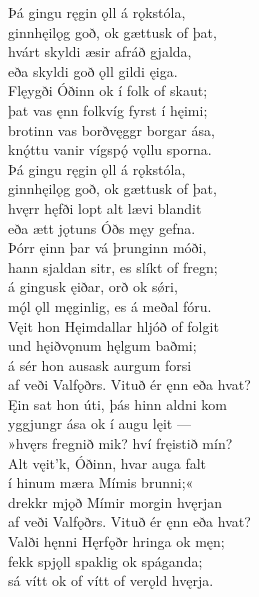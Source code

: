 \bva Þá gingu ręgin ǫll \hld á rǫkstóla, \\%
ginnhęilǫg goð, \hld ok gættusk of þat, \\%
hvárt skyldi æsir \hld afráð gjalda, \\%
eða skyldi goð ǫll \hld gildi ęiga.\\%

\bva Flęygði Óðinn \hld ok í folk of skaut; \\%
þat vas ęnn folkvíg \hld fyrst í hęimi; \\%
brotinn vas borðvęggr \hld borgar ása, \\%
knǫ́ttu vanir vígspǫ́ \hld vǫllu sporna.\\%

\bva Þá gingu ręgin ǫll \hld á rǫkstóla, \\%
ginnhęilǫg goð, \hld ok gættusk of þat, \\%
hvęrr hęfði lopt alt \hld lævi blandit \\%
eða ætt jǫtuns \hld Óðs męy gefna.\\%

\bva Þórr ęinn þar vá \hld þrunginn móði, \\%
hann sjaldan sitr, \hld es slíkt of fregn; \\%
á gingusk ęiðar, \hld orð ok sǿri, \\%
mǫ́l ǫll męginlig, \hld es á meðal fóru.\\%

\bva Vęit hon Hęimdallar \hld hljóð of folgit \\%
und hęiðvǫnum \hld hęlgum baðmi; \\%
á sér hon ausask \hld aurgum forsi \\%
af veði Valfǫðrs. \hld Vituð ér ęnn eða hvat?\\%

\bva Ęin sat hon úti, \hld þás hinn aldni kom \\%
yggjungr ása \hld ok í augu lęit — \\%
»hvęrs fregnið mik? \hld hví fręistið mín? \\%
Alt vęit'k, Óðinn, \hld hvar auga falt \\%
í hinum mæra \hld Mímis brunni;« \\%
drekkr mjǫð Mímir \hld morgin hvęrjan \\%
af veði Valfǫðrs. \hld Vituð ér ęnn eða hvat?\\%

\bva Valði hęnni Hęrfǫðr \hld hringa ok męn; \\%
fekk spjǫll spaklig \hld ok spáganda; \\%
sá vítt ok of vítt \hld of verǫld hvęrja.\\%

